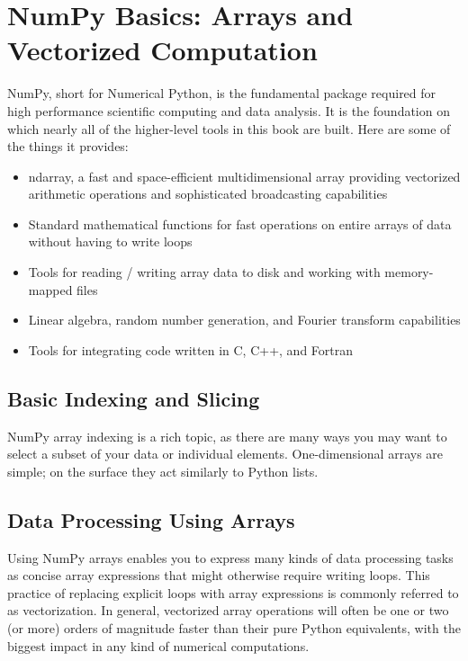 \section{NumPy Basics: Arrays and Vectorized Computation}

NumPy, short for Numerical Python, is the fundamental package required for high
performance scientific computing and data analysis. It is the foundation on which
nearly all of the higher-level tools in this book are built. Here are some of the things it
provides:

\begin{itemize}
\item ndarray, a fast and space-efficient multidimensional array providing vectorized
arithmetic operations and sophisticated broadcasting capabilities
\item Standard mathematical functions for fast operations on entire arrays of data
without having to write loops
\item Tools for reading / writing array data to disk and working with memory-mapped
files
\item Linear algebra, random number generation, and Fourier transform capabilities
\item Tools for integrating code written in C, C++, and Fortran
\end{itemize}


\subsection{Basic Indexing and Slicing}
NumPy array indexing is a rich topic, as there are many ways you may want to select
a subset of your data or individual elements. One-dimensional arrays are simple; on
the surface they act similarly to Python lists.
\subsection{Data Processing Using Arrays}
Using NumPy arrays enables you to express many kinds of data processing tasks as
concise array expressions that might otherwise require writing loops. This practice of
replacing explicit loops with array expressions is commonly referred to as vectorization.
In general, vectorized array operations will often be one or two (or more) orders
of magnitude faster than their pure Python equivalents, with the biggest impact in any
kind of numerical computations.

